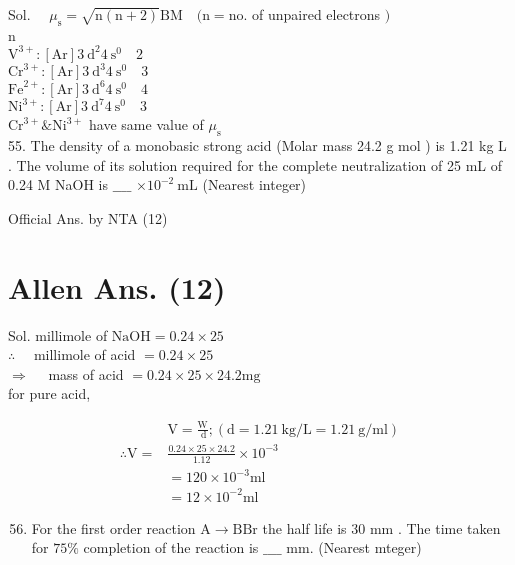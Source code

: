 \documentclass[10pt]{article}
\begin{document}
Sol. \(\quad \mu_{\mathrm{s}}=\sqrt{\mathrm{n}(\mathrm{n}+2)} \mathrm{BM} \quad(\mathrm{n}=\mathrm{no}\). of unpaired electrons \()\)\\
n\\
\(\mathrm{V}^{3+}:[\mathrm{Ar}] 3 \mathrm{~d}^{2} 4 \mathrm{~s}^{0} \quad 2\)\\
\(\mathrm{Cr}^{3+}:[\mathrm{Ar}] 3 \mathrm{~d}^{3} 4 \mathrm{~s}^{0} \quad 3\)\\
\(\mathrm{Fe}^{2+}:[\mathrm{Ar}] 3 \mathrm{~d}^{6} 4 \mathrm{~s}^{0} \quad 4\)\\
\(\mathrm{Ni}^{3+}:[\mathrm{Ar}] 3 \mathrm{~d}^{7} 4 \mathrm{~s}^{0} \quad 3\)\\
\(\mathrm{Cr}^{3+} \& \mathrm{Ni}^{3+}\) have same value of \(\mu_{\mathrm{s}}\)\\
55. The density of a monobasic strong acid (Molar mass 24.2 g mol ) is 1.21 kg L . The volume of its solution required for the complete neutralization of 25 mL of 0.24 M NaOH is \(\_\_\_\_\) \(\times 10^{-2} \mathrm{~mL}\) (Nearest integer)

Official Ans. by NTA (12)

\section*{Allen Ans. (12)}
Sol. millimole of \(\mathrm{NaOH}=0.24 \times 25\)\\
\(\therefore \quad\) millimole of acid \(=0.24 \times 25\)\\
\(\Rightarrow \quad\) mass of acid \(=0.24 \times 25 \times 24.2 \mathrm{mg}\)\\
for pure acid,

\[
\begin{aligned}
& \mathrm{V}=\frac{\mathrm{W}}{\mathrm{~d}} ;(\mathrm{d}=1.21 \mathrm{~kg} / \mathrm{L}=1.21 \mathrm{~g} / \mathrm{ml}) \\
\therefore \mathrm{V}= & \frac{0.24 \times 25 \times 24.2}{1.12} \times 10^{-3} \\
& =120 \times 10^{-3} \mathrm{ml} \\
& =12 \times 10^{-2} \mathrm{ml}
\end{aligned}
\]

\begin{enumerate}
  \setcounter{enumi}{55}
  \item For the first order reaction \(\mathrm{A} \rightarrow \mathrm{B} \mathrm{Br}\) the half life is 30 mm . The time taken for \(75 \%\) completion of the reaction is \(\_\_\_\_\) mm. (Nearest mteger)
\end{enumerate}
\end{document}

